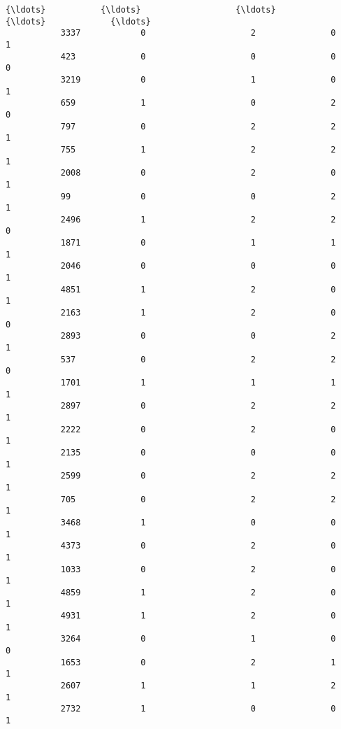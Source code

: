 \documentclass[11pt]{article}
\begin{document}
\begin{Verbatim}[commandchars=\\\{\}]
           {\ldots}           {\ldots}                   {\ldots}             {\ldots}             {\ldots}   
           3337            0                     2               0               1   
           423             0                     0               0               0   
           3219            0                     1               0               1   
           659             1                     0               2               0   
           797             0                     2               2               1   
           755             1                     2               2               1   
           2008            0                     2               0               1   
           99              0                     0               2               1   
           2496            1                     2               2               0   
           1871            0                     1               1               1   
           2046            0                     0               0               1   
           4851            1                     2               0               1   
           2163            1                     2               0               0   
           2893            0                     0               2               1   
           537             0                     2               2               0   
           1701            1                     1               1               1   
           2897            0                     2               2               1   
           2222            0                     2               0               1   
           2135            0                     0               0               1   
           2599            0                     2               2               1   
           705             0                     2               2               1   
           3468            1                     0               0               1   
           4373            0                     2               0               1   
           1033            0                     2               0               1   
           4859            1                     2               0               1   
           4931            1                     2               0               1   
           3264            0                     1               0               0   
           1653            0                     2               1               1   
           2607            1                     1               2               1   
           2732            1                     0               0               1   
           

\end{Verbatim}
\end{document}
